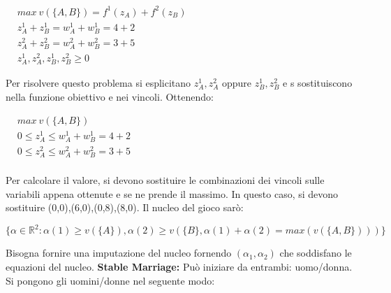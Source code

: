 \documentclass{article}
\theoremstyle{definition}
\theoremstyle{remark}
\begin{document}
\begin{center}
    $\begin{aligned}
        & max\ v(\{A,B\})= f^1(z_A)+f^2(z_B)\\
        & z_A^1+z_B^1=w_A^1+w_B^1=4+2\\
        & z_A^2+z_B^2=w_A^2+w_B^2=3+5\\
        & z_A^1,z_A^2,z_B^1,z_B^2\geq 0
    \end{aligned}$
\end{center}
Per risolvere questo problema si esplicitano \(z_A^1,z_A^2\) oppure \(z_B^1,z_B^2\) e s sostituiscono nella funzione obiettivo e nei vincoli. Ottenendo:
\begin{center}
    $\begin{aligned}
        & max\ v(\{A,B\})\\
        & 0\leq z_A^1\leq w_A^1+w_B^1=4+2\\
        & 0\leq z_A^2\leq w_A^2+w_B^2=3+5\\
    \end{aligned}$
\end{center}
Per calcolare il valore, si devono sostituire le combinazioni dei vincoli sulle variabili appena ottenute e se ne prende il massimo.\newline
In questo caso, si devono sostituire (0,0),(6,0),(0,8),(8,0).\newline
Il nucleo del gioco sarò:
\begin{center}
    \(\{\alpha\in\mathbb{R}^2:\alpha(1)\geq v(\{A\}),\alpha(2)\geq v(\{B\},\alpha(1)+\alpha(2)=max(v(\{A,B\})))\}\)
\end{center}
Bisogna fornire una imputazione del nucleo fornendo \((\alpha_1,\alpha_2)\) che soddisfano le equazioni del nucleo.\newline
\textbf{Stable Marriage:} Può iniziare da entrambi: uomo/donna. Si pongono gli uomini/donne nel seguente modo:
\end{document}
